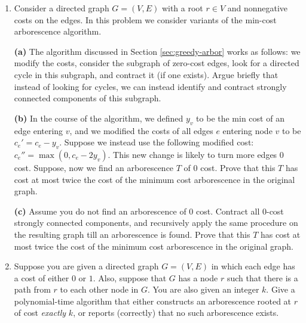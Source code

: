 \documentclass[12pt]{article}
\begin{document}
\begin{enumerate}
\item

Consider a directed graph $G=(V,E)$ with a root $r \in V$ and
nonnegative costs on the edges. In this problem we consider variants of the
min-cost arborescence algorithm.

{\bf (a)} The algorithm discussed in Section \ref{sec:greedy-arbor}
works as follows: we modify the costs,
consider the subgraph of zero-cost edges, look for a directed cycle in this
subgraph, and contract it (if one exists). Argue briefly that instead of
looking for cycles, we can instead identify and contract strongly connected
components of this subgraph.

{\bf (b)} In the course of the algorithm,
we defined $y_v$ to be the min cost of an edge entering $v$,
and we modified the costs of all edges $e$
entering node $v$ to be $c_e'=c_e-y_v$.
Suppose we instead use the following modified cost: $c_e''=\max(0,c_e-2y_v)$.
This new change is likely to turn more edges 0 cost. Suppose, now we find
an arborescence $T$ of  0 cost. Prove that this $T$ has cost at most twice
the cost of the minimum cost arborescence in the original graph.

{\bf (c)\Star} Assume you do not
find an arborescence of 0 cost. Contract all 0-cost strongly connected
components, and recursively apply the same procedure on the resulting graph
till an arborescence is found.  Prove that this $T$ has cost at most twice
the cost of the minimum cost arborescence in the original graph.


\item\Star
Suppose you are given a directed graph $G = (V,E)$
in which each edge has a cost of either $0$ or $1$.
Also, suppose that $G$ has a node $r$ such that
there is a path from $r$ to each other node in $G$.
You are also given an integer $k$.
Give a polynomial-time algorithm that
either constructs an arborescence rooted at $r$ of cost {\em exactly} $k$,
or reports (correctly) that no such arborescence exists.

\end{enumerate}
\end{document}
